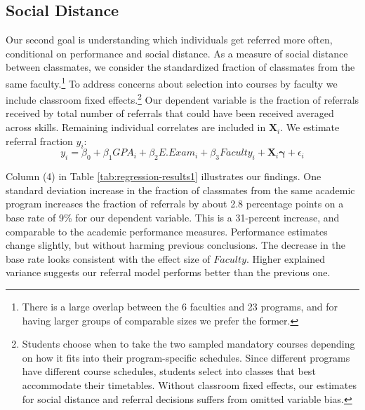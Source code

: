 \documentclass[11pt,a4paper,oneside]{article}
\begin{document}
\subsection{Social Distance}
Our second goal is understanding which individuals get referred more often, conditional on performance and social distance. As a measure of social distance between classmates, we consider the standardized fraction of classmates from the same faculty.\footnote{There is a large overlap between the 6 faculties and 23 programs, and for having larger groups of comparable sizes we prefer the former.} To address concerns about selection into courses by faculty we include classroom fixed effects.\footnote{Students choose when to take the two sampled mandatory courses depending on how it fits into their program-specific schedules. Since different programs have different course schedules, students select into classes that best accommodate their timetables. Without classroom fixed effects, our estimates for social distance and referral decisions suffers from omitted variable bias.} Our dependent variable is the fraction of referrals received by total number of referrals that could have been received averaged across skills. Remaining individual correlates are included in $\mathbf{X}_{i}$. We estimate referral fraction $y_{i}$: 
\begin{equation}
    y_{i} = \beta_0 + \beta_1{GPA}_{i} + \beta_2{E.Exam}_{i} + \beta_3{Faculty}_{i} + \mathbf{X}_{i}\boldsymbol{\gamma} + \epsilon_{i}    
\end{equation}

Column (4) in Table \ref{tab:regression-results1} illustrates our findings. One standard deviation increase in the fraction of classmates from the same academic program increases the fraction of referrals by about 2.8 percentage points on a base rate of 9\% for our dependent variable. This is a 31-percent increase, and comparable to the academic performance measures. Performance estimates change slightly, but without harming previous conclusions. The decrease in the base rate looks consistent with the effect size of $Faculty$. Higher explained variance suggests our referral model performs better than the previous one.
\end{document}
